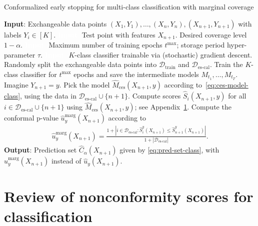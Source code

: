 \begin{algorithm}[H]
    \caption{Conformalized early stopping for multi-class classification with marginal coverage}
    \label{alg:class_full_seq_marg}
    \begin{algorithmic}[1]
        \STATE \textbf{Input}: Exchangeable data points $(X_{1},Y_{1}), \ldots, (X_{n},Y_{n}), (X_{n+1},Y_{n+1})$ with labels $Y_i \in [K]$.
        \STATE \textcolor{white}{\textbf{Input}:} Test point with features $X_{n+1}$. Desired coverage level $1-\alpha$.
        \STATE \textcolor{white}{\textbf{Input}:} Maximum number of training epochs $t^{\max}$; storage period hyper-parameter $\tau$.
        \STATE \textcolor{white}{\textbf{Input}:} $K$-class classifier trainable via (stochastic) gradient descent.
        \STATE Randomly split the exchangeable data points into $\mathcal{D}_{\text{train}}$ and $\mathcal{D}_{\text{es-cal}}$.
        \STATE Train the $K$-class classifier for $t^{\text{max}}$ epochs and save the intermediate models $M_{t_1} , \dots, M_{t_T}$.
        \STATE Imagine $Y_{n+1}=y$.
        \STATE Pick the model $\hat{M}_{\text{ces}}(X_{n+1},y)$ according to~\eqref{eq:ces-model-class}, using the data in $\mathcal{D}_{\text{es-cal}} \cup \{n+1\}$.
        \STATE Compute scores $\hat{S}_i(X_{n+1},y)$ for all $i \in \mathcal{D}_{\text{es-cal}} \cup \{n+1\}$ using $\hat{M}_{\text{ces}}(X_{n+1},y)$; see Appendix~\ref{app:class-scores}.
        \STATE Compute the conformal p-value $\hat{u}^{\text{marg}}_y(X_{n+1})$ according to
        \begin{align}\label{eq:conformal_pval-class_marg}
          \hat{u}^{\text{marg}}_y(X_{n+1}) = \frac{1 + |i \in \mathcal{D}_{\text{es-cal}}: \hat{S}_{i}^y(X_{n+1}) \leq \hat{S}_{n+1}^y(X_{n+1})|}{1+|\mathcal{D}_{\text{es-cal}}|}.
        \end{align}
        \ENDFOR
        \STATE \textbf{Output}: Prediction set $\hat{C}_{\alpha}(X_{n+1})$ given by \eqref{eq:pred-set-class}, with $\hat{u}^{\text{marg}}_y(X_{n+1})$ instead of $\hat{u}_y(X_{n+1})$.
    \end{algorithmic}
\end{algorithm}


\section{Review of nonconformity scores for classification} \label{app:class-scores}

